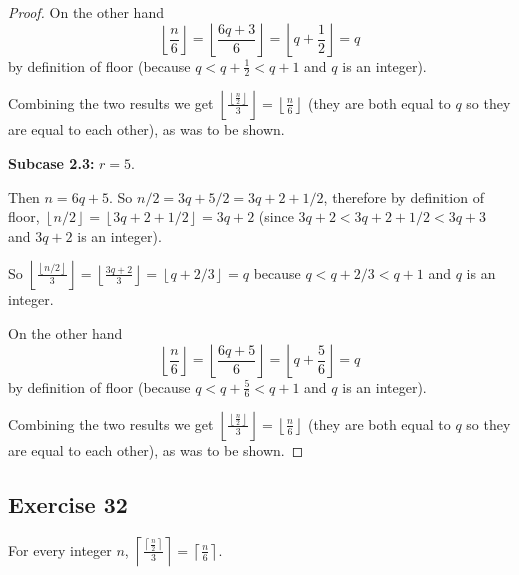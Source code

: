 \documentclass[14pt]{extarticle}
\newcommand{\dps}{\displaystyle}
\newcommand{\floor}[1]{{\left\lfloor#1\right\rfloor}}
\newcommand{\ceil}[1]{{\left\lceil#1\right\rceil}}
\begin{document}
\begin{proof}
On the other hand 
\[
\floor{\frac{n}{6}} = \floor{\frac{6q+3}{6}} = \floor{q+\frac{1}{2}} = q
\]
by definition of floor (because $q < q+\frac{1}{2} < q+1$ and $q$ is an integer).

Combining the two results we get $ \floor{\frac{\floor{\frac{n}{2}}}{3}} = \floor{\frac{n}{6}}$ (they are both equal to $q$ so they are equal to each other), as was to be shown.

{\bf Subcase 2.3:} $r = 5$. 

Then $n = 6q+5$. So $n/2 = 3q+5/2 = 3q+2+1/2$, therefore by definition of floor, $\floor{n/2} = \floor{3q+2+1/2} = 3q+2$ (since $3q+2 < 3q+2+1/2< 3q+3$ and $3q+2$ is an integer). 

So $\floor{\frac{\floor{n/2}}{3}} = \floor{\frac{3q+2}{3}} = \floor{q+2/3} = q$ because $q < q+2/3 < q+1$ and $q$ is an integer.

On the other hand 
\[
\floor{\frac{n}{6}} = \floor{\frac{6q+5}{6}} = \floor{q+\frac{5}{6}} = q
\]
by definition of floor (because $q < q+\frac{5}{6} < q+1$ and $q$ is an integer).

Combining the two results we get $ \floor{\frac{\floor{\frac{n}{2}}}{3}} = \floor{\frac{n}{6}}$ (they are both equal to $q$ so they are equal to each other), as was to be shown.
\end{proof}

\subsection{Exercise 32}
For every integer $n$, $\dps \ceil{\frac{\ceil{\frac{n}{2}}}{3}} = \ceil{\frac{n}{6}}$.
\end{document}
